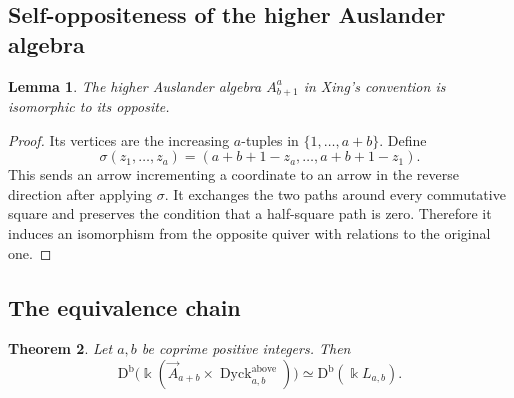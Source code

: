 \documentclass[12pt,a4paper,english,reqno]{amsart}
\theoremstyle{plain}
\newtheorem{theorem}{Theorem}[section]
\newtheorem{lemma}[theorem]{Lemma}
\theoremstyle{definition}
\newcommand{\kk}{\Bbbk}
\newcommand{\Db}{\mathrm D^{\mathrm b}}
\newcommand{\Dyck}{\operatorname{Dyck}}
\begin{document}
\subsection{Self-oppositeness of the higher Auslander algebra}

\begin{lemma}
\label{lem:A-self-op}
The higher Auslander algebra $A_{b+1}^{a}$ in Xing's convention is
isomorphic to its opposite.
\end{lemma}

\begin{proof}
Its vertices are the increasing $a$-tuples in
$\{1,\ldots,a+b\}$.  Define
\begin{equation}
 \sigma(z_1,\ldots,z_a)
 =
 (a+b+1-z_a,\ldots,a+b+1-z_1).
\label{eq:sigma}
\end{equation}
This sends an arrow incrementing a coordinate to an arrow in the reverse
direction after applying $\sigma$.  It exchanges the two paths around every
commutative square and preserves the condition that a half-square path is
zero.  Therefore it induces an isomorphism from the opposite quiver with
relations to the original one.
\end{proof}

\subsection{The equivalence chain}

\begin{theorem}
\label{thm:CLR-conjecture}
Let $a,b$ be coprime positive integers.  Then
\[
 \Db\!\bigl(
 \kk(\vec A_{a+b}\times\Dyck^{\mathrm{above}}_{a,b})
 \bigr)
 \simeq
 \Db(\kk L_{a,b}).
\]
\end{theorem}
\end{document}
